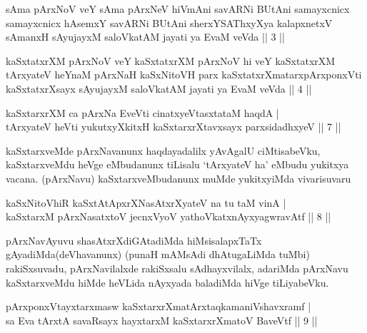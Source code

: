 \vskip 5pt
\begin{kandikeshl}
sAma pArxNoV veY sAma pArxNeV hiVmAni savARNi BUtAni samayxcnicx samayxcnicx hAsemxY savARNi BUtAni sherxYSAThxyXya kalapxnetxV sAmanxH sAyujayxM saloVkatAM jayati ya EvaM veVda || 3 ||
\end{kandikeshl}
\vskip 5pt
\begin{kandikeshl}
kaSxtatxrXM pArxNoV veY kaSxtatxrXM pArxNoV hi veY kaSxtatxrXM tArxyateV heYnaM pArxNaH kaSxNitoVH parx kaSxtatxrXmatarxpArxponxVti kaSxtatxrXsayx sAyujayxM saloVkatAM jayati ya EvaM veVda || 4 ||
\end{kandikeshl}
\vskip 5pt

\begin{shl}
kaSxtarxrXM ca pArxNa EveVti cinatxyeVtasxtataM haqdA | \\
tArxyateV heVti yukutxyXkitxH kaSxtarxrXtavxsayx parxsidadhxyeV \hfill ||  7 || 
\end{shl}
\vskip 5pt
\begin{artha}
kaSxtarxveMde pArxNavanunx haqdayadalilx yAvAgalU ciMtisabeVku, kaSxtarxveMdu heVge eMbudanunx tiLisalu `tArxyateV ha' eMbudu yukitxya vacana. (pArxNavu) kaSxtarxveMbudanunx muMde yukitxyiMda vivarisuvaru \mdash 
\end{artha}
\vskip 5pt
\begin{shl}
kaSxNitoVhiR kaSxtAtApxrXNasAtxrXyateV na tu taM vinA | \\
kaSxtarxM pArxNasatxtoV jecnxVyoV yathoVkatxnAyxyagwravAtf \hfill ||  8 || 
\end{shl}
\vskip 5pt
\begin{artha}
pArxNavAyuvu shasAtxrXdiGAtadiMda hiMsisalapxTaTx gAyadiMda\break (deVhavanunx) (punaH mAMsAdi dhAtugaLiMda tuMbi) rakiSxsuvadu, pArxNavilalxde rakiSxsalu sAdhayxvilalx, adariMda pArxNavu kaSxtarxveMdu hiMde heVLida nAyxyada baladiMda hiVge tiLiyabeVku.
\end{artha}
\vskip 5pt
\vskip 5pt
\begin{shl}
pArxponxVtayxtarxmasw kaSxtarxrXmatArxtaqkamaniVshavxramf | \\
sa Eva tArxtA savaRsayx hayxtarxM kaSxtarxrXmatoV BaveVtf \hfill ||  9 ||
\end{shl}
\vskip 5pt

